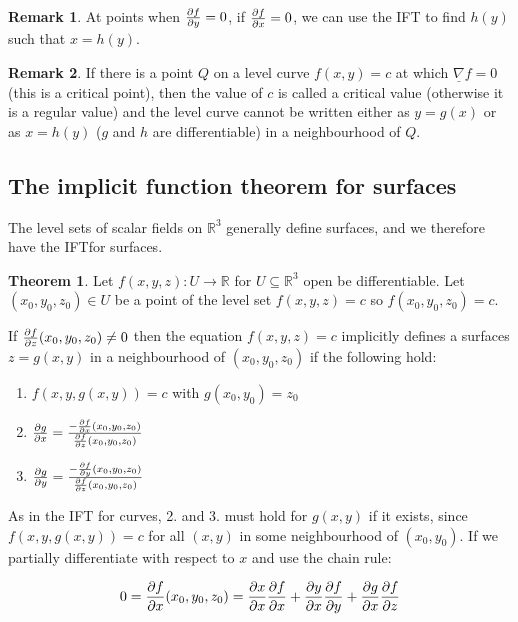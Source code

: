 \documentclass[12pt,a4paper]{article}
\theoremstyle{definition}
\newtheorem{theorem}[definition]{Theorem}
\newtheorem*{remark}{Remark}
\begin{document}
\begin{remark}
	At points when $\diffp{f}{y} = 0$, if $\diffp{f}{x} = 0$, we can use the IFT to find $h(y)$ such that $x = h(y)$.
\end{remark}

\begin{remark}
	If there is a point $Q$ on a level curve $f(x, y) = c$ at which $\underline{\nabla} f = 0$ (this is a critical point), then the value of $c$ is called a critical value (otherwise it is a regular value) and the level curve cannot be written either as $y = g(x)$ or as $x = h(y)$ ($g$ and $h$ are differentiable) in a neighbourhood of $Q$.
\end{remark}

\subsection{The implicit function theorem for surfaces}

The level sets of scalar fields on $\mathbb{R}^3$ generally define surfaces, and we therefore have the IFTfor surfaces.

\begin{theorem}
	Let $f(x, y, z): U \rightarrow \mathbb{R}$ for $U \subseteq \mathbb{R}^3$ open be differentiable. Let $(x_0, y_0, z_0) \in U$ be a point of the level set $f(x, y, z) = c$ so $f(x_0, y_0, z_0) = c$.

	If $\diffp{f}{z} (x_0, y_0, z_0) \ne 0$ then the equation $f(x, y, z) = c$ implicitly defines a surfaces $z = g(x, y)$ in a neighbourhood of $(x_0, y_0, z_0)$ if the following hold:
	\begin{enumerate}
		\item $f(x, y, g(x, y)) = c$ with $g(x_0, y_0) = z_0$
		\item $\diffp{g}{x} = \frac{-\diffp{f}{x} (x_0, y_0, z_0)}{\diffp{f}{z} (x_0, y_0, z_0)}$
		\item $\diffp{g}{y} = \frac{-\diffp{f}{y} (x_0, y_0, z_0)}{\diffp{f}{z} (x_0, y_0, z_0)}$
	\end{enumerate}
\end{theorem}

As in the IFT for curves, 2. and 3. must hold for $g(x, y)$ if it exists, since $f(x, y, g(x, y)) = c$ for all $(x, y)$ in some neighbourhood of $(x_0, y_0)$. If we partially differentiate with respect to $x$ and use the chain rule:

\[0 = \diffp{f}{x} (x_0, y_0, z_0) = \diffp{x}{x} \diffp{f}{x} + \diffp{y}{x}\diffp{f}{y} + \diffp{g}{x}\diffp{f}{z}\]
\end{document}
